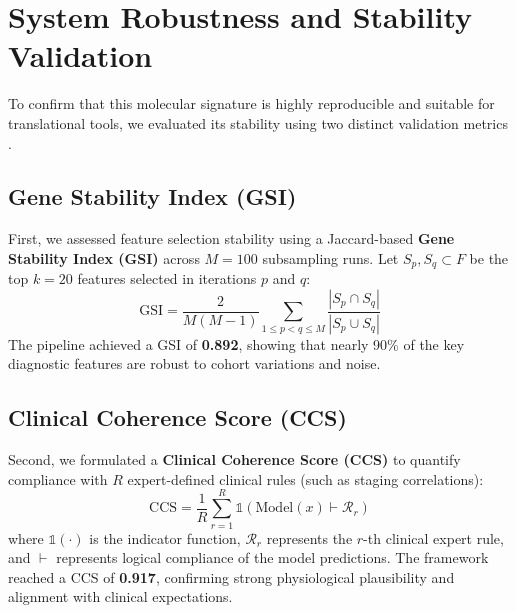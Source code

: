 \documentclass[11pt]{article}
\begin{document}
\section{System Robustness and Stability Validation}

To confirm that this molecular signature is highly reproducible and suitable for translational tools, we evaluated its stability using two distinct validation metrics \citep{huang2025clinical, peters2026integrative}.

\subsection{Gene Stability Index (GSI)}
First, we assessed feature selection stability using a Jaccard-based \textbf{Gene Stability Index (GSI)} across $M = 100$ subsampling runs. Let $S_p, S_q \subset F$ be the top $k = 20$ features selected in iterations $p$ and $q$:
\begin{equation}
\text{GSI} = \frac{2}{M(M-1)} \sum_{1 \le p < q \le M} \frac{|S_p \cap S_q|}{|S_p \cup S_q|}
\end{equation}
The pipeline achieved a GSI of \textbf{0.892}, showing that nearly 90\% of the key diagnostic features are robust to cohort variations and noise.

\subsection{Clinical Coherence Score (CCS)}
Second, we formulated a \textbf{Clinical Coherence Score (CCS)} to quantify compliance with $R$ expert-defined clinical rules (such as staging correlations):
\begin{equation}
\text{CCS} = \frac{1}{R} \sum_{r=1}^R \mathds{1}\left( \text{Model}(x) \vdash \mathcal{R}_r \right)
\end{equation}
where $\mathds{1}(\cdot)$ is the indicator function, $\mathcal{R}_r$ represents the $r$-th clinical expert rule, and $\vdash$ represents logical compliance of the model predictions. The framework reached a CCS of \textbf{0.917}, confirming strong physiological plausibility and alignment with clinical expectations.
\end{document}
